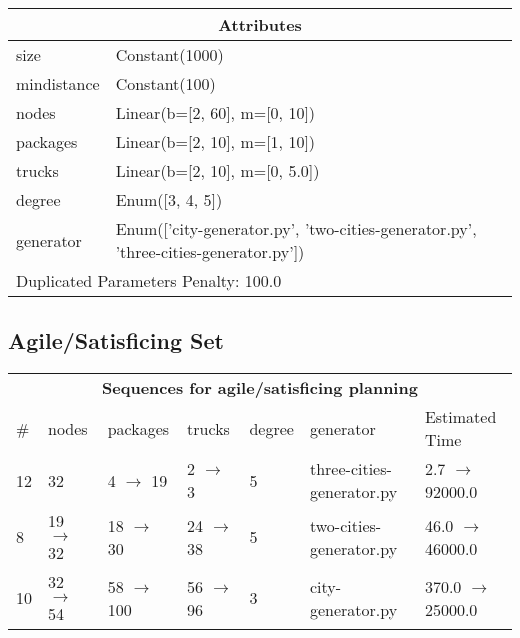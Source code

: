 \documentclass{article}
\begin{document}
                    \begin{center}
                    \begin{tabular}{@{}p{}p{}@{}}
                    \multicolumn{2}{c}{\bf \large Attributes}\\\midrule
                    size & Constant(1000)\\
mindistance & Constant(100)\\
nodes & Linear(b=[2, 60], m=[0, 10])\\
packages & Linear(b=[2, 10], m=[1, 10])\\
trucks & Linear(b=[2, 10], m=[0, 5.0])\\
degree & Enum([3, 4, 5])\\
generator & Enum(['city-generator.py', 'two-cities-generator.py', 'three-cities-generator.py'])
                    
                     \\\midrule
                    \multicolumn{2}{l}{Duplicated Parameters Penalty: 100.0}
                    \end{tabular}
                    \end{center}
                
                         \subsection*{Agile/Satisficing Set}

                        \begin{center}
                        \begin{tabular}{@{}l|l|l|l|l|l|l@{}}
                        \multicolumn{7}{c}{\bf \large Sequences for agile/satisficing planning}\\
                        \# & nodes & packages & trucks & degree & generator & Estimated Time\\\midrule
                        12&32&4 $\rightarrow$ 19&2 $\rightarrow$ 3&5&three-cities-generator.py&2.7 $\rightarrow$ 92000.0\\
8&19 $\rightarrow$ 32&18 $\rightarrow$ 30&24 $\rightarrow$ 38&5&two-cities-generator.py&46.0 $\rightarrow$ 46000.0\\
10&32 $\rightarrow$ 54&58 $\rightarrow$ 100&56 $\rightarrow$ 96&3&city-generator.py&370.0 $\rightarrow$ 25000.0
                        \end{tabular}
                        \end{center}
                    
\end{document}
